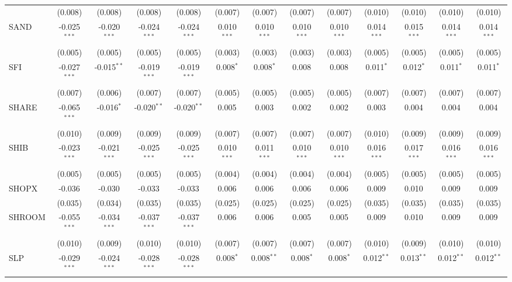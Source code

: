 \begin{table}[!htbp]
\begin{tabular}{@{\extracolsep{5pt}}lcccccccccccc}
  & (0.008) & (0.008) & (0.008) & (0.008) & (0.007) & (0.007) & (0.007) & (0.007) & (0.010) & (0.010) & (0.010) & (0.010) \\
 SAND & -0.025$^{***}$ & -0.020$^{***}$ & -0.024$^{***}$ & -0.024$^{***}$ & 0.010$^{***}$ & 0.010$^{***}$ & 0.010$^{***}$ & 0.010$^{***}$ & 0.014$^{***}$ & 0.015$^{***}$ & 0.014$^{***}$ & 0.014$^{***}$ \\
  & (0.005) & (0.005) & (0.005) & (0.005) & (0.003) & (0.003) & (0.003) & (0.003) & (0.005) & (0.005) & (0.005) & (0.005) \\
 SFI & -0.027$^{***}$ & -0.015$^{**}$ & -0.019$^{***}$ & -0.019$^{***}$ & 0.008$^{*}$ & 0.008$^{*}$ & 0.008$^{}$ & 0.008$^{}$ & 0.011$^{*}$ & 0.012$^{*}$ & 0.011$^{*}$ & 0.011$^{*}$ \\
  & (0.007) & (0.006) & (0.007) & (0.007) & (0.005) & (0.005) & (0.005) & (0.005) & (0.007) & (0.007) & (0.007) & (0.007) \\
 SHARE & -0.065$^{***}$ & -0.016$^{*}$ & -0.020$^{**}$ & -0.020$^{**}$ & 0.005$^{}$ & 0.003$^{}$ & 0.002$^{}$ & 0.002$^{}$ & 0.003$^{}$ & 0.004$^{}$ & 0.004$^{}$ & 0.004$^{}$ \\
  & (0.010) & (0.009) & (0.009) & (0.009) & (0.007) & (0.007) & (0.007) & (0.007) & (0.010) & (0.009) & (0.009) & (0.009) \\
 SHIB & -0.023$^{***}$ & -0.021$^{***}$ & -0.025$^{***}$ & -0.025$^{***}$ & 0.010$^{***}$ & 0.011$^{***}$ & 0.010$^{***}$ & 0.010$^{***}$ & 0.016$^{***}$ & 0.017$^{***}$ & 0.016$^{***}$ & 0.016$^{***}$ \\
  & (0.005) & (0.005) & (0.005) & (0.005) & (0.004) & (0.004) & (0.004) & (0.004) & (0.005) & (0.005) & (0.005) & (0.005) \\
 SHOPX & -0.036$^{}$ & -0.030$^{}$ & -0.033$^{}$ & -0.033$^{}$ & 0.006$^{}$ & 0.006$^{}$ & 0.006$^{}$ & 0.006$^{}$ & 0.009$^{}$ & 0.010$^{}$ & 0.009$^{}$ & 0.009$^{}$ \\
  & (0.035) & (0.034) & (0.035) & (0.035) & (0.025) & (0.025) & (0.025) & (0.025) & (0.035) & (0.035) & (0.035) & (0.035) \\
 SHROOM & -0.055$^{***}$ & -0.034$^{***}$ & -0.037$^{***}$ & -0.037$^{***}$ & 0.006$^{}$ & 0.006$^{}$ & 0.005$^{}$ & 0.005$^{}$ & 0.009$^{}$ & 0.010$^{}$ & 0.009$^{}$ & 0.009$^{}$ \\
  & (0.010) & (0.009) & (0.010) & (0.010) & (0.007) & (0.007) & (0.007) & (0.007) & (0.010) & (0.009) & (0.010) & (0.010) \\
 SLP & -0.029$^{***}$ & -0.024$^{***}$ & -0.028$^{***}$ & -0.028$^{***}$ & 0.008$^{*}$ & 0.008$^{**}$ & 0.008$^{*}$ & 0.008$^{*}$ & 0.012$^{**}$ & 0.013$^{**}$ & 0.012$^{**}$ & 0.012$^{**}$ \\

\end{tabular}
\end{table}
